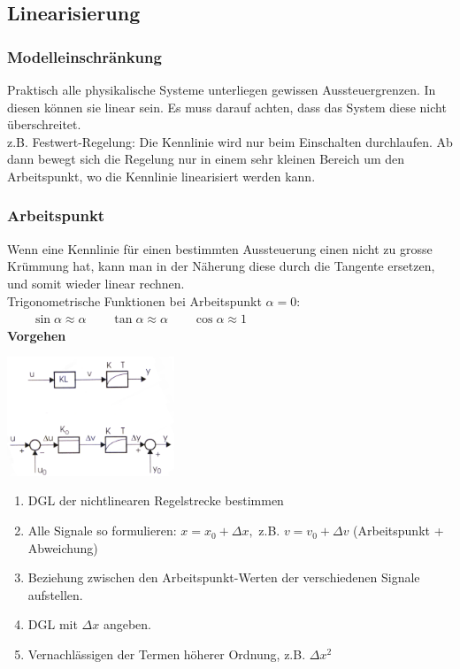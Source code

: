 \newpage

	\subsection{Linearisierung}
		\subsubsection{Modelleinschränkung }
			Praktisch alle physikalische Systeme unterliegen gewissen Aussteuergrenzen.
			In diesen können sie linear sein. Es muss darauf achten, dass  das System
			diese nicht überschreitet. \\
			z.B. Festwert-Regelung: Die Kennlinie wird nur beim Einschalten durchlaufen.
			Ab dann bewegt sich die Regelung nur in einem sehr kleinen Bereich um den
			Arbeitspunkt, wo die Kennlinie linearisiert werden kann. \\
			
		\subsubsection{Arbeitspunkt }
			Wenn eine Kennlinie für einen bestimmten Aussteuerung einen nicht zu grosse
			Krümmung hat, kann man in der Näherung diese durch die Tangente ersetzen, und
			somit wieder linear rechnen. \\
			Trigonometrische Funktionen bei Arbeitspunkt $\alpha = 0$: $\qquad \sin \alpha \approx
			\alpha \qquad \tan \alpha \approx \alpha \qquad \cos \alpha \approx 1$ \\
			\textbf{Vorgehen} \\
			\begin{minipage}[c]{5cm}
				\includegraphics[width=5cm]{bilder/LinArbeitspunkt}
			\end{minipage}
			\begin{minipage}[c]{16cm}
				\begin{enumerate}
					\item DGL der nichtlinearen Regelstrecke bestimmen
					\item Alle Signale so formulieren: $x = x_0 + \Delta x,$ z.B. $v=v_0 + \Delta v$ (Arbeitspunkt + Abweichung)
					\item Beziehung zwischen den Arbeitspunkt-Werten der verschiedenen Signale aufstellen.
					\item DGL mit $\Delta x$ angeben.
					\item Vernachlässigen der Termen höherer Ordnung, z.B. $\Delta x^2$
				\end{enumerate}
	
			\end{minipage}
			
